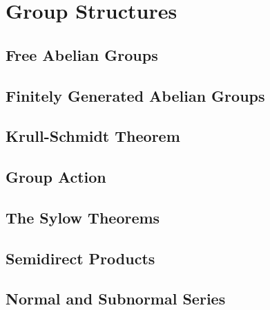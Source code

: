 \documentclass[a4paper,sfsidenotes,openany]{tufte-book}
\theoremstyle{definition}
\begin{document}
\newpage

\chapter{Group Structures}
\begin{fullwidth}
\section{Free Abelian Groups}

\section{Finitely Generated Abelian Groups}

\section{Krull-Schmidt Theorem}

\section{Group Action}

\section{The Sylow Theorems}

\section{Semidirect Products}

\section{Normal and Subnormal Series}

\end{fullwidth}

\newpage

\end{document}
